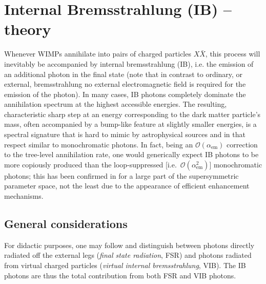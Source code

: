 \section{Internal Bremsstrahlung (IB) -- theory}

Whenever WIMPs annihilate into pairs of charged particles $X\bar X$, this process 
will inevitably be accompanied by internal 
bremsstrahlung (IB), i.e. the emission of an additional photon in the final state 
(note that in contrast to ordinary, or external, bremsstrahlung no external 
electromagnetic field is required for the emission of the photon). In many cases, 
IB photons completely dominate the annihilation spectrum at the highest accessible 
energies. The resulting, characteristic sharp step at an energy corresponding to 
the dark matter particle's mass, often accompanied by a bump-like feature at slightly smaller energies, is a spectral signature that is hard to mimic by 
astrophysical sources and in that respect similar to monochromatic photons. 
In fact, being an $\mathcal{O}(\alpha_\mathrm{em})$ correction to the tree-level 
annihilation rate, one would generically expect IB photons to be more copiously 
produced than the loop-suppressed [i.e.~$\mathcal{O}(\alpha_\mathrm{em}^2)$] 
monochromatic photons; this has been confirmed in \cite{ib_susy} for a large part 
of the supersymmetric parameter space, not the least due to the appearance of 
efficient enhancement mechanisms. 



\subsection{General considerations}


For didactic purposes, one may follow \cite{ib_susy} and distinguish between 
photons directly radiated off the external legs (\emph{final state radiation}, FSR) 
and photons radiated from virtual charged particles (\emph{virtual internal 
bremsstrahlung}, VIB). The IB photons are thus  the total contribution from both 
FSR and VIB photons.

